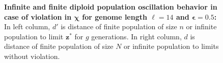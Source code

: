 \begin{figure}[H]
\begin{center}
\hspace{-3em}%
\vspace{-0.5em}  \hspace{-3em}%


\caption{\textbf{Infinite and finite diploid population oscillation behavior in case of violation in $\bm{\chi}$ for genome length $\ell = 14$ and $\bm{\epsilon} = 0.5$:} 
  In left column, $d'$ is distance of finite population of size $n$ or infinite population to limit $\bm{z}^\ast$ for $g$ generations. In right column, $d$ is distance of finite population of size $N$ or infinite population to limits without violation.}
\label{oscillation_14d_vio_chi_0.5}
\end{center}
\end{figure}




